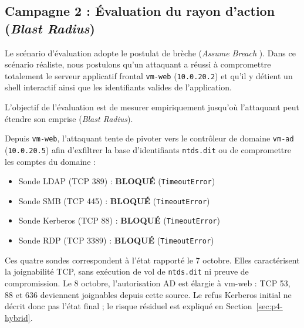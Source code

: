 \documentclass[a4paper,12pt]{report}
\begin{document}
\subsection{Campagne 2 : Évaluation du rayon d'action (\textit{Blast Radius})}
Le scénario d'évaluation adopte le postulat de brèche (\textit{Assume Breach} \cite{dod_zta}). Dans ce scénario réaliste, nous postulons qu'un attaquant a réussi à compromettre totalement le serveur applicatif frontal \texttt{vm-web} (\texttt{10.0.20.2}) et qu'il y détient un shell interactif ainsi que les identifiants valides de l'application.

L'objectif de l'évaluation est de mesurer empiriquement jusqu'où l'attaquant peut étendre son emprise (\textit{Blast Radius}).

Depuis \texttt{vm-web}, l'attaquant tente de pivoter vers le contrôleur de domaine \texttt{vm-ad} (\texttt{10.0.20.5}) afin d'exfiltrer la base d'identifiants \texttt{ntds.dit} ou de compromettre les comptes du domaine :
\begin{itemize}
\item Sonde LDAP (TCP 389) : \textbf{BLOQUÉ} (\texttt{TimeoutError})
\item Sonde SMB (TCP 445) : \textbf{BLOQUÉ} (\texttt{TimeoutError})
\item Sonde Kerberos (TCP 88) : \textbf{BLOQUÉ} (\texttt{TimeoutError})
\item Sonde RDP (TCP 3389) : \textbf{BLOQUÉ} (\texttt{TimeoutError})
\end{itemize}
Ces quatre sondes correspondent à l'état rapporté le 7 octobre. Elles caractérisent la joignabilité TCP, sans exécution de vol de \texttt{ntds.dit} ni preuve de compromission. Le 8 octobre, l'autorisation AD est élargie à vm-web : TCP 53, 88 et 636 deviennent joignables depuis cette source. Le refus Kerberos initial ne décrit donc pas l'état final ; le risque résiduel est expliqué en Section~\ref{sec:p4-hybrid}.
\end{document}

